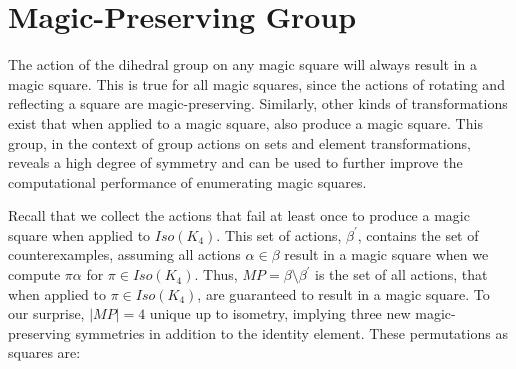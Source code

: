 \documentclass[12pt]{report}
\begin{document}
\section{Magic-Preserving Group}

\par The action of the dihedral group on any magic square will always result in a magic square.
This is true for all magic squares, since the actions of rotating and reflecting a square are
magic-preserving. Similarly, other kinds of transformations exist that when applied to a magic
square, also produce a magic square. This group, in the context of group actions on sets and
element transformations, reveals a high degree of symmetry and can be used to further improve the
computational performance of enumerating magic squares.

\par Recall that we collect the actions that fail at least once to produce a magic square when
applied to $Iso(K_4)$. This set of actions, ${\beta}^\prime$, contains the set of counterexamples,
assuming all actions $\alpha\in\beta$ result in a magic square when we compute $\pi\alpha$ for
$\pi\in Iso(K_4)$. Thus, $MP=\beta\setminus{\beta}^\prime$ is the set of all actions, that when
applied to $\pi\in Iso(K_4)$, are guaranteed to result in a magic square. To our surprise,
$\left|MP\right|=4$ unique up to isometry, implying three new magic-preserving symmetries in
addition to the identity element. These permutations as squares are:
\end{document}

